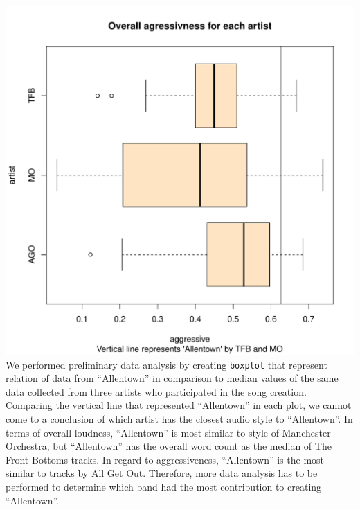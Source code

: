 \documentclass{article}\usepackage[]{graphicx}\usepackage[]{xcolor}
\makeatletter
\def\maxwidth{ %
  \ifdim\Gin@nat@width>\linewidth
    \linewidth
  \else
    \Gin@nat@width
  \fi
}
\newenvironment{knitrout}{}{} %
\makeatother
\begin{document}
\begin{multicols}{2}
\begin{knitrout}
\end{knitrout}
\begin{knitrout}\scriptsize
{}\color{fgcolor}
\includegraphics[width=\maxwidth]{figure/unnamed-chunk-5-1} 
\end{knitrout}
We performed preliminary data analysis by creating \texttt{boxplot} that represent relation of data from ``Allentown'' in comparison to median values of the same data collected from three artists who participated in the song creation. 
Comparing the vertical line that represented ``Allentown'' in each plot, we cannot come to a conclusion of which artist has the closest audio style to ``Allentown''. In terms of overall loudness, ``Allentown'' is most similar to style of Manchester Orchestra, but ``Allentown'' has the overall word count as the median of The Front Bottoms tracks. In regard to aggressiveness, ``Allentown'' is the most similar to tracks by All Get Out. Therefore, more data analysis has to be performed to determine which band had the most contribution to creating ``Allentown''.
\vspace{2em}
\begin{tiny}

\end{tiny}
\end{multicols}
\end{document}
